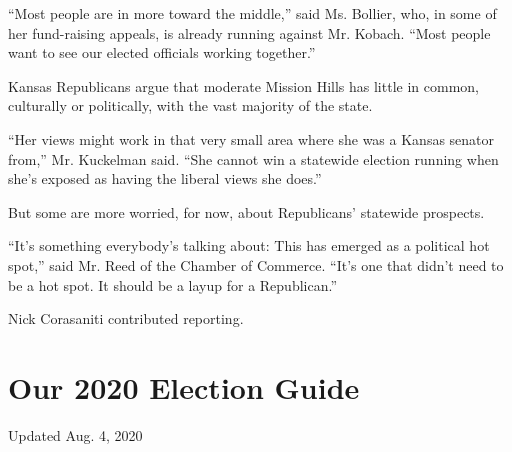 ``Most people are in more toward the middle,'' said Ms. Bollier, who, in
some of her fund-raising appeals, is already running against Mr. Kobach.
``Most people want to see our elected officials working together.''

Kansas Republicans argue that moderate Mission Hills has little in
common, culturally or politically, with the vast majority of the state.

``Her views might work in that very small area where she was a Kansas
senator from,'' Mr. Kuckelman said. ``She cannot win a statewide
election running when she's exposed as having the liberal views she
does.''

But some are more worried, for now, about Republicans' statewide
prospects.

``It's something everybody's talking about: This has emerged as a
political hot spot,'' said Mr. Reed of the Chamber of Commerce. ``It's
one that didn't need to be a hot spot. It should be a layup for a
Republican.''

Nick Corasaniti contributed reporting.

\hypertarget{our-2020-election-guide}{%
\section{Our 2020 Election Guide}\label{our-2020-election-guide}}

Updated Aug. 4, 2020

